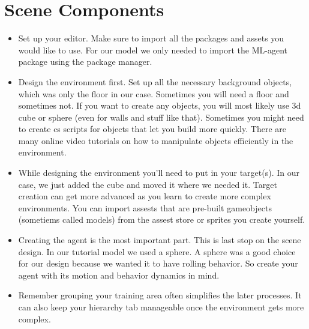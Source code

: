 \documentclass[11pt,fleqn,openany]{book} %
\begin{document}
\section{Scene Components}
\begin{itemize}
    \item Set up your editor. Make sure to import all the packages and assets you would like to use. For our model we only needed to import the ML-agent package using the package manager.
    \item Design the environment first. Set up all the necessary background objects, which  was only the floor in our case. Sometimes you will need a floor and sometimes not. If you want to create any objects, you will most likely use 3d cube or sphere (even for walls and stuff like that). Sometimes you might need to create cs scripts for objects that let you build more quickly. There are many online video tutorials on how to manipulate objects efficiently in the environment.
    \item While designing the environment you'll need to put in your target(s). In our case, we just added the cube and moved it where we needed it. Target creation can get more advanced as you learn to create more complex environments. You can import assests that are pre-built gameobjects (sometiems called models) from the assest store or sprites you create yourself.
    \item Creating the agent is the most important part. This is last stop on the scene design. In our tutorial model we used a sphere. A sphere was a good choice for our design because we wanted it to have rolling behavior. So create your agent with its motion and behavior dynamics in mind.
    \item Remember grouping your training area often simplifies the later processes. It can also keep your hierarchy tab manageable once the environment gets more complex.
\end{itemize}
\end{document}
